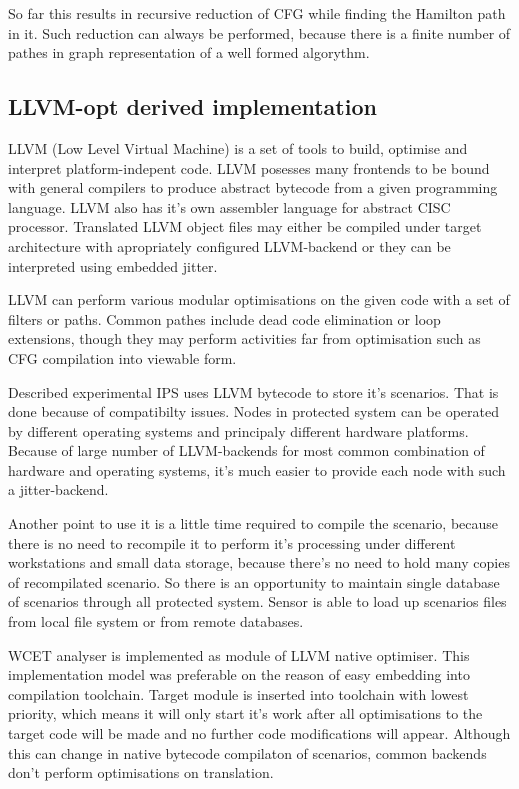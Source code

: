 \documentclass[10pt, conference, compsocconf]{IEEEtran}
\begin{document}
So far this results in recursive reduction of CFG while finding the Hamilton path in it. Such reduction can always be performed, because there is a finite number of pathes in graph representation of a well formed algorythm.

\subsection{LLVM-opt derived implementation}


LLVM (Low Level Virtual Machine) is a set of tools to build, optimise and interpret platform-indepent code. LLVM posesses many frontends to be bound with general compilers to produce abstract bytecode from a given programming language. LLVM also has it's own assembler language for abstract CISC processor. Translated LLVM object files may either be compiled under target architecture with apropriately configured LLVM-backend or they can be interpreted using embedded jitter.

LLVM can perform various modular optimisations on the given code with a set of filters or paths. Common pathes include dead code elimination or loop extensions, though they may perform activities far from optimisation such as CFG compilation into viewable form.

Described experimental IPS uses LLVM bytecode to store it's scenarios. That is done because of compatibilty issues. Nodes in protected system can be operated by different operating systems and principaly different hardware platforms. Because of large number of LLVM-backends for most common combination of hardware and operating systems, it's much easier to provide each node with such a jitter-backend.

Another point to use it is a little time required to compile the scenario, because there is no need to recompile it to perform it's processing under different workstations and small data storage, because there's no need to hold many copies of recompilated scenario. So there is an opportunity to maintain single database of scenarios through all protected system.
Sensor is able to load up scenarios files from local file system or from remote databases.


WCET analyser is implemented as module of LLVM native optimiser. This implementation model was preferable on the reason of easy embedding into compilation toolchain. Target module is inserted into toolchain with lowest priority, which means it will only start it's work after all optimisations to the target code will be made and no further code modifications will appear. Although this can change in native bytecode compilaton of scenarios, common backends don't perform optimisations on translation.
\end{document}
